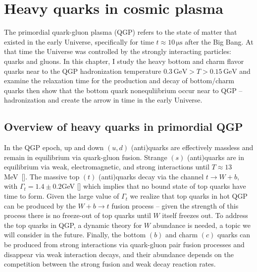 \chapter{Heavy quarks in cosmic plasma}\label{Bottom}

The primordial quark-gluon plasma (QGP) refers to the state of matter that existed in the early Universe, specifically for time $t\approx10\, \mathrm{\mu s}$ after the Big Bang. At that time the Universe was controlled by the strongly interacting particles: quarks and gluons. In this chapter, I study the heavy bottom and charm flavor quarks near to the QGP hadronization temperature $0.3\,\mathrm{GeV}>T>0.15\,\mathrm{GeV}$ and examine the relaxation time for the production and decay of bottom/charm quarks then show that the bottom quark nonequliibrium occur near to QGP –hadronization and create the arrow in time in the early Universe.


\section{Overview of heavy quarks in primordial QGP}




In the QGP epoch, up and down $(u,d)$ (anti)quarks are effectively massless and remain in equilibrium via quark-gluon fusion. Strange $(s)$ (anti)quarks are in equilibrium via weak, electromagnetic, and strong interactions until $T\approx13$ MeV~[\cite{Yang:2021bko}]. The massive top $(t)$ (anti)quarks decay via the channel $t\to W+b$, with $\Gamma_t=1.4\pm0.2$\;GeV [\cite{ParticleDataGroup:2018ovx}] which implies that no bound state of top quarks have time to form. Given the large value of $\Gamma_t$ we realize that top quarks in hot QGP can be produced by the $ W+b\to t$ fusion process -- given the strength of this process there is no freeze-out of top quarks until $W$ itself freezes out. To address the top quarks in QGP, a dynamic theory for $W$ abundance is needed, a topic we will consider in the future. Finally, the bottom $(b)$ and charm $(c)$ quarks can be produced from strong interactions via quark-gluon pair fusion processes and disappear via weak interaction decays, and their abundance depends on the competition between the strong fusion and weak decay reaction rates.

